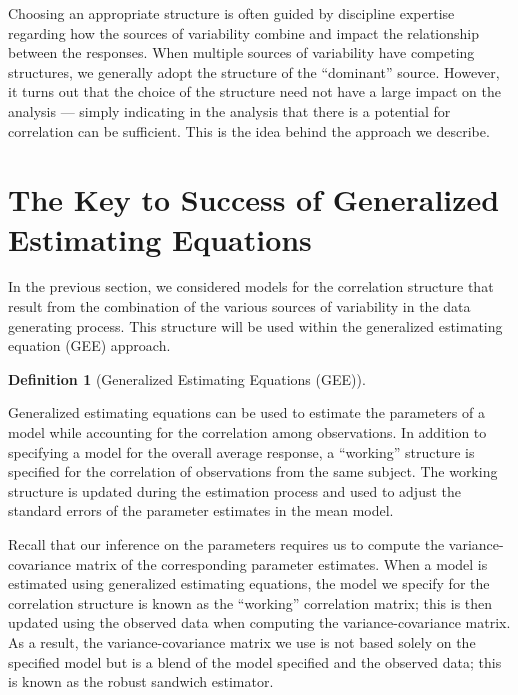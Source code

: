 \documentclass[
  letterpaper,
  DIV=11,
  numbers=noendperiod]{scrreprt}
\theoremstyle{definition}
\theoremstyle{definition}
\newtheorem{definition}{Definition}[chapter]
\theoremstyle{remark}
\begin{document}
Choosing an appropriate structure is often guided by discipline
expertise regarding how the sources of variability combine and impact
the relationship between the responses. When multiple sources of
variability have competing structures, we generally adopt the structure
of the ``dominant'' source. However, it turns out that the choice of the
structure need not have a large impact on the analysis --- simply
indicating in the analysis that there is a potential for correlation can
be sufficient. This is the idea behind the approach we describe.

\hypertarget{the-key-to-success-of-generalized-estimating-equations}{%
\section{The Key to Success of Generalized Estimating
Equations}\label{the-key-to-success-of-generalized-estimating-equations}}

In the previous section, we considered models for the correlation
structure that result from the combination of the various sources of
variability in the data generating process. This structure will be used
within the generalized estimating equation (GEE) approach.

\begin{definition}[Generalized Estimating Equations
(GEE)]\protect\hypertarget{def-gee}{}\label{def-gee}

Generalized estimating equations can be used to estimate the parameters
of a model while accounting for the correlation among observations. In
addition to specifying a model for the overall average response, a
``working'' structure is specified for the correlation of observations
from the same subject. The working structure is updated during the
estimation process and used to adjust the standard errors of the
parameter estimates in the mean model.

\end{definition}

Recall that our inference on the parameters requires us to compute the
variance-covariance matrix of the corresponding parameter estimates.
When a model is estimated using generalized estimating equations, the
model we specify for the correlation structure is known as the
``working'' correlation matrix; this is then updated using the observed
data when computing the variance-covariance matrix. As a result, the
variance-covariance matrix we use is not based solely on the specified
model but is a blend of the model specified and the observed data; this
is known as the robust sandwich estimator.
\end{document}
